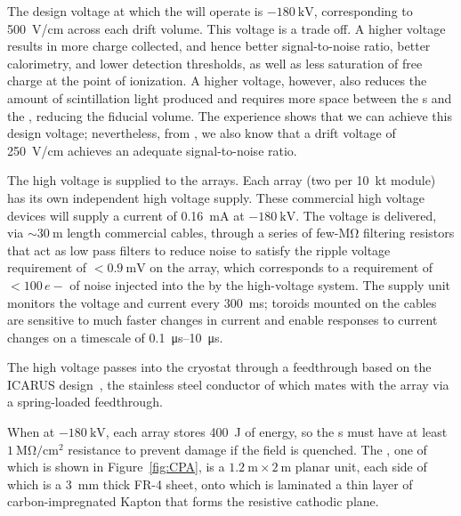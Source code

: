 The design voltage at which the   will operate is $-\SI{180}{\kilo\volt}$, corresponding to \SI{500}{\volt/\cm} across each drift volume. This voltage is a trade off. A higher voltage results in more charge collected, and hence better signal-to-noise ratio, better calorimetry, and lower detection thresholds, as well as less saturation of free charge at the point of ionization. A higher voltage, however, also reduces the amount of scintillation light produced and requires more space between the s and the , reducing the fiducial volume. The  experience shows that we can achieve this design voltage; nevertheless, from , we also know that a drift voltage of \SI{250}{\volt/\cm} achieves an adequate signal-to-noise ratio.

The high voltage is supplied to the  arrays. Each  array (two per \SI{10}{\kilo\tonne} module) has its own independent high voltage supply. These commercial high voltage devices will supply a current of \SI{0.16}{\milli\ampere} at $-\SI{180}{\kilo\volt}$. The voltage is delivered, via $\sim\!\SI{30}{\meter}$ length commercial cables, through a series of few-\si{\mega\ohm} filtering resistors that act as low pass filters to reduce noise to satisfy the ripple voltage requirement of $<\!\SI{0.9}{\milli\volt}$ on the  array, which corresponds to a requirement of $<\!100\,e-$ of noise injected into the  by the high-voltage system. The supply unit monitors the voltage and current every \SI{300}{\milli\second}; toroids mounted on the cables are sensitive to much faster changes in current and enable responses to current changes on a timescale of \SIrange{0.1}{10}{\micro\second}.

The high voltage passes into the cryostat through a feedthrough based on the ICARUS design~\cite{ref:ICARUSFeedthrough}, %
the stainless steel conductor of which mates with the  array via a spring-loaded feedthrough.

When at $-\SI{180}{\kilo\volt}$, each  array stores \SI{400}{\joule} of energy, so the s must have at least $\SI{1}{\mega\ohm/\cm^{2}}$ resistance to prevent damage if the field is quenched. The , one of which is shown in Figure~\ref{fig:CPA}, is a $\SI{1.2}{\meter}\times\SI{2}{\meter}$ planar unit, each side of which is a \SI{3}{\mm} thick FR-4 sheet, onto which is laminated a thin layer of carbon-impregnated Kapton that forms the resistive cathodic plane.

